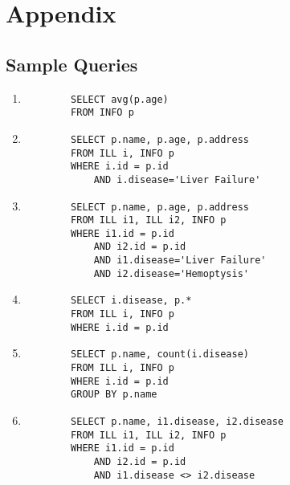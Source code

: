 
\section{Appendix}
\label{app}

\subsection{Sample Queries}
\label{app:queries}

\begin{enumerate}

    \item \begin{verbatim}
        SELECT avg(p.age)
        FROM INFO p
    \end{verbatim}

    \item \begin{verbatim}
        SELECT p.name, p.age, p.address 
        FROM ILL i, INFO p 
        WHERE i.id = p.id 
            AND i.disease='Liver Failure'
    \end{verbatim}
    
    \item \begin{verbatim}
        SELECT p.name, p.age, p.address 
        FROM ILL i1, ILL i2, INFO p 
        WHERE i1.id = p.id 
            AND i2.id = p.id 
            AND i1.disease='Liver Failure' 
            AND i2.disease='Hemoptysis'
    \end{verbatim}

    \item \begin{verbatim}
        SELECT i.disease, p.* 
        FROM ILL i, INFO p 
        WHERE i.id = p.id
    \end{verbatim}
   
    \item \begin{verbatim}
        SELECT p.name, count(i.disease) 
        FROM ILL i, INFO p 
        WHERE i.id = p.id 
        GROUP BY p.name 
    \end{verbatim}

    \item \begin{verbatim}
        SELECT p.name, i1.disease, i2.disease 
        FROM ILL i1, ILL i2, INFO p 
        WHERE i1.id = p.id 
            AND i2.id = p.id 
            AND i1.disease <> i2.disease
    \end{verbatim}


\end{enumerate}



